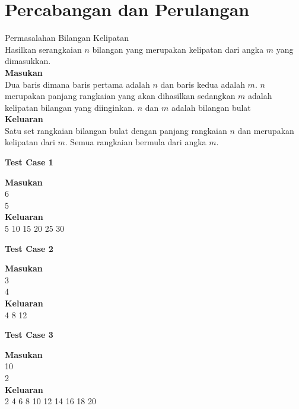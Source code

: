 \chapter{Percabangan dan Perulangan}

\begin{permasalahan}{Permasalahan Bilangan Kelipatan}\\
\label{prob:bilanganKelipatan}
	Hasilkan serangkaian $n$ bilangan yang merupakan kelipatan dari angka $m$ yang dimasukkan.\\
	\textbf{Masukan}\\
	Dua baris dimana baris pertama adalah $n$ dan baris kedua adalah $m$. $n$ merupakan panjang rangkaian yang akan dihasilkan sedangkan $m$ adalah kelipatan bilangan yang diinginkan. $n$ dan $m$ adalah bilangan bulat\\
	\textbf{Keluaran}\\
	Satu set rangkaian bilangan bulat dengan panjang rangkaian $n$ dan merupakan kelipatan dari $m$. Semua rangkaian bermula dari angka $m$.\\
	\begin{center}
	\textbf{Test Case 1}\\
	\end{center}
	\textbf{Masukan}\\
	6\\
	5\\
	\textbf{Keluaran}\\
	5 10 15 20 25 30 \\
	\begin{center}
	\textbf{Test Case 2}\\
	\end{center}
	\textbf{Masukan}\\
	3\\
	4\\
	\textbf{Keluaran}\\
	4 8 12 \\
	\begin{center}
	\textbf{Test Case 3}\\
	\end{center}
	\textbf{Masukan}\\
	10\\
	2\\
	\textbf{Keluaran}\\
	2 4 6 8 10 12 14 16 18 20\\

\end{permasalahan}

